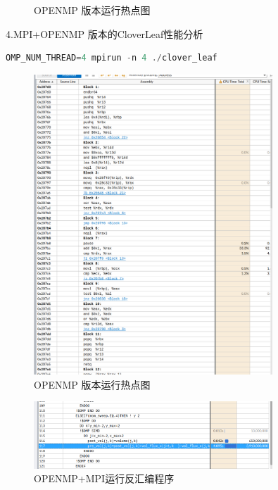 \documentclass{article}
\begin{document}
\begin{CJK}{UTF8}{gbsn}
\begin{figure}[H]
    \caption{OPENMP 版本运行热点图}
\end{figure}
4.MPI+OPENMP 版本的CloverLeaf性能分析
\begin{lstlisting}[language=C++]
    OMP_NUM_THREAD=4 mpirun -n 4 ./clover_leaf
\end{lstlisting} 

\begin{figure}[H]
    \centering
    \includegraphics[width=0.8\textwidth]{./call9.png}
    \caption{OPENMP 版本运行热点图}
\end{figure}
\begin{figure}[H]
    \centering
    \includegraphics[width=0.8\textwidth]{./call10.png}
    \caption{OPENMP+MPI运行反汇编程序}
\end{figure}

\end{CJK}
\end{document}
